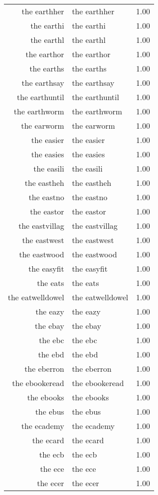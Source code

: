\begin{table}[ht]
\begin{tabular}{rlr}
  the earthher & the earthher & 1.00 \\ 
  the earthi & the earthi & 1.00 \\ 
  the earthl & the earthl & 1.00 \\ 
  the earthor & the earthor & 1.00 \\ 
  the earths & the earths & 1.00 \\ 
  the earthsay & the earthsay & 1.00 \\ 
  the earthuntil & the earthuntil & 1.00 \\ 
  the earthworm & the earthworm & 1.00 \\ 
  the earworm & the earworm & 1.00 \\ 
  the easier & the easier & 1.00 \\ 
  the easies & the easies & 1.00 \\ 
  the easili & the easili & 1.00 \\ 
  the eastheh & the eastheh & 1.00 \\ 
  the eastno & the eastno & 1.00 \\ 
  the eastor & the eastor & 1.00 \\ 
  the eastvillag & the eastvillag & 1.00 \\ 
  the eastwest & the eastwest & 1.00 \\ 
  the eastwood & the eastwood & 1.00 \\ 
  the easyfit & the easyfit & 1.00 \\ 
  the eats & the eats & 1.00 \\ 
  the eatwelldowel & the eatwelldowel & 1.00 \\ 
  the eazy & the eazy & 1.00 \\ 
  the ebay & the ebay & 1.00 \\ 
  the ebc & the ebc & 1.00 \\ 
  the ebd & the ebd & 1.00 \\ 
  the eberron & the eberron & 1.00 \\ 
  the ebookeread & the ebookeread & 1.00 \\ 
  the ebooks & the ebooks & 1.00 \\ 
  the ebus & the ebus & 1.00 \\ 
  the ecademy & the ecademy & 1.00 \\ 
  the ecard & the ecard & 1.00 \\ 
  the ecb & the ecb & 1.00 \\ 
  the ece & the ece & 1.00 \\ 
  the ecer & the ecer & 1.00 \\ 

\end{tabular}
\end{table}
